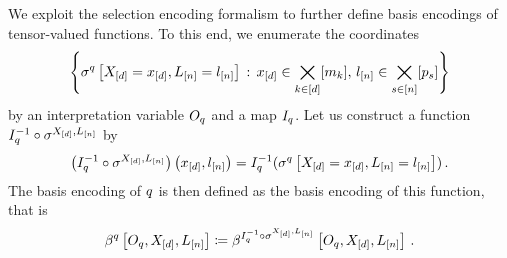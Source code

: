 We exploit the selection encoding formalism to further define basis encodings of tensor-valued functions.
To this end, we enumerate the coordinates
\begin{align*}
	\left\{ \sigma^{q}\left[X_{[d]}=x_{[d]},L_{[n]}=l_{[n]}\right] \,:\, x_{[d]}\in\bigtimes_{k\in[d]}[m_{k}],\, l_{[n]}\in\bigtimes_{s\in[n]}[p_{s}] \right\}
\end{align*}
by an interpretation variable $O_{q}$ and a map $I_{q}$.
Let us construct a function $I_{q}^{-1}\circ\sigma^{X_{[d]},L_{[n]}}$ by
\begin{align*}
	\left(I_{q}^{-1}\circ\sigma^{X_{[d]},L_{[n]}}\right)\left(x_{[d]},l_{[n]}\right)
	= I_{q}^{-1}(\sigma^{q}\left[X_{[d]}=x_{[d]},L_{[n]}=l_{[n]}\right]) \, .
\end{align*}
The basis encoding of $q$ is then defined as the basis encoding of this function, that is
\begin{align*}
	\beta^{q}\left[O_{q},X_{[d]},L_{[n]}\right]
	\coloneqq \beta^{I_{q}^{-1}\circ\sigma^{X_{[d]},L_{[n]}}}\left[O_{q},X_{[d]},L_{[n]}\right] \, .
\end{align*}



